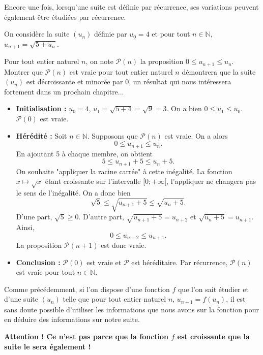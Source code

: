\documentclass[11pt,fleqn]{book} %
\begin{document}
Encore une fois, lorsqu'une suite est définie par récurrence, ses variations peuvent également être étudiées par récurrence.

\begin{example}On considère la suite $(u_n)$ définie par $u_0=4$ et pour tout $n\in\mathbb{N}$, $u_{n+1}=\sqrt{5+u_n}$.

Pour tout entier naturel $n$, on note $\mathcal{P}(n)$ la proposition $0\leqslant u_{n+1} \leqslant u_n$. Montrer que $\mathcal{P}(n)$ est vraie pour tout entier naturel $n$ démontrera que la suite $(u_n)$ est décroissante et minorée par 0, un résultat qui nous intéressera fortement dans un prochain chapitre...

\begin{itemize}
\item \textbf{Initialisation :} $u_0=4$, $u_1=\sqrt{5+4}=\sqrt{9}=3$. On a bien $0 \leqslant u_1 \leqslant u_0$. $\mathcal{P}(0)$ est vraie.
\vskip5pt
\item \textbf{Hérédité :} Soit $n\in\mathbb{N}$. Supposons que $\mathcal{P}(n)$ est vraie. On a alors
\[0\leqslant u_{n+1} \leqslant u_n.\]
En ajoutant 5 à chaque membre, on obtient
\[5\leqslant u_{n+1} +5\leqslant u_n+5.\]
On souhaite "appliquer la racine carrée" à cette inégalité. La fonction $x\mapsto \sqrt{x}$ étant croissante sur l'intervalle $[0;+\infty[$, l'appliquer ne changera pas le sens de l'inégalité. On a donc bien
\[ \sqrt{5} \leqslant \sqrt{u_{n+1}+5} \leqslant \sqrt{u_n+5}.\]
D'une part, $\sqrt{5} \geqslant 0$. D'autre part, $\sqrt{u_{n+1}+5}=u_{n+2}$ et $\sqrt{u_{n}+5}=u_{n+1}$. Ainsi,
\[0 \leqslant u_{n+2} \leqslant u_{n+1}.\]
La proposition $\mathcal{P}(n+1)$ est donc vraie.
\vskip5pt
\item \textbf{Conclusion :} $\mathcal{P}(0)$ est vraie et $\mathcal{P}$ est héréditaire. Par récurrence, $\mathcal{P}(n)$ est vraie pour tout $n\in\mathbb{N}$.

\end{itemize}\end{example}
\newpage
Comme précédemment, si l'on dispose d'une fonction $f$ que l'on sait étudier et d'une suite $(u_n)$ telle que pour tout entier naturel $n$, $u_{n+1}=f(u_n)$, il est sans doute possible d'utiliser les informations que nous avons sur la fonction pour en déduire des informations sur notre suite.

\textbf{Attention ! Ce n'est pas parce que la fonction $f$ est croissante que la suite le sera également !}
\end{document}
